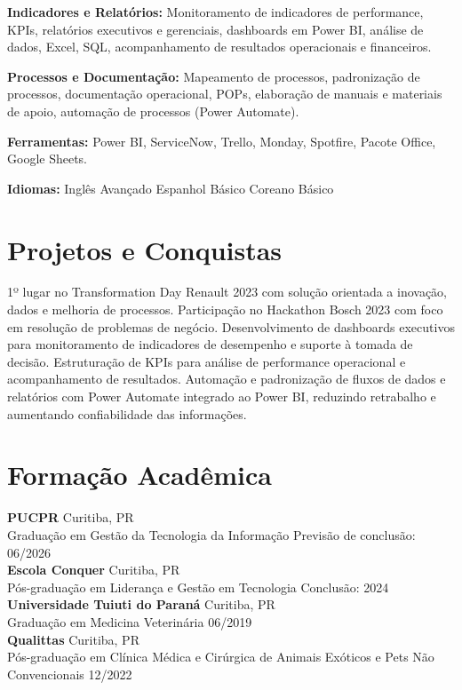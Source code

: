 \documentclass[11pt,a4paper]{article}
\begin{document}
\textbf{Indicadores e Relatórios:} Monitoramento de indicadores de performance, KPIs, relatórios executivos e gerenciais, dashboards em Power BI, análise de dados, Excel, SQL, acompanhamento de resultados operacionais e financeiros.

\textbf{Processos e Documentação:} Mapeamento de processos, padronização de processos, documentação operacional, POPs, elaboração de manuais e materiais de apoio, automação de processos (Power Automate).

\textbf{Ferramentas:} Power BI, ServiceNow, Trello, Monday, Spotfire, Pacote Office, Google Sheets.

\textbf{Idiomas:} Inglês Avançado \enspace\textbullet\enspace Espanhol Básico \enspace\textbullet\enspace Coreano Básico

\section{Projetos e Conquistas}

1º lugar no Transformation Day Renault 2023 com solução orientada a inovação, dados e melhoria de processos. Participação no Hackathon Bosch 2023 com foco em resolução de problemas de negócio. Desenvolvimento de dashboards executivos para monitoramento de indicadores de desempenho e suporte à tomada de decisão. Estruturação de KPIs para análise de performance operacional e acompanhamento de resultados. Automação e padronização de fluxos de dados e relatórios com Power Automate integrado ao Power BI, reduzindo retrabalho e aumentando confiabilidade das informações.

\section{Formação Acadêmica}

\textbf{PUCPR} \hfill Curitiba, PR\\
Graduação em Gestão da Tecnologia da Informação \hfill Previsão de conclusão: 06/2026\\[6pt]

\textbf{Escola Conquer} \hfill Curitiba, PR\\
Pós-graduação em Liderança e Gestão em Tecnologia \hfill Conclusão: 2024\\[6pt]

\textbf{Universidade Tuiuti do Paraná} \hfill Curitiba, PR\\
Graduação em Medicina Veterinária \hfill 06/2019\\[6pt]

\textbf{Qualittas} \hfill Curitiba, PR\\
Pós-graduação em Clínica Médica e Cirúrgica de Animais Exóticos e Pets Não Convencionais \hfill 12/2022
\end{document}
